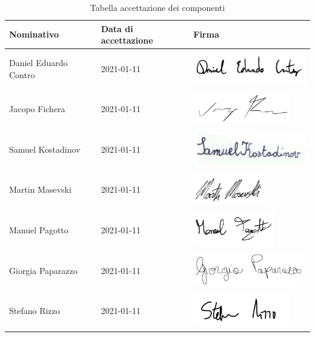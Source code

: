 \documentclass[../piano_di_progetto.tex]{subfiles}
\begin{document}
\begin{table}[!ht]
	\centering
	\begin{tabular}{|l|l|l|}
		\hline
		\rowcolor{lightgray}
		\textbf{Nominativo} & \textbf{Data di accettazione} & \textbf{Firma} \\ 
		\hline
		Daniel Eduardo Contro & 2021-01-11 & \includegraphics[height=1.5cm]{componenti/img/firma_dec} \\ 
		\hline
		Jacopo Fichera & 2021-01-11 & \includegraphics[height=1.5cm]{componenti/img/firma_jf} \\ 
		\hline
		Samuel Kostadinov & 2021-01-11 & \includegraphics[height=1.5cm]{componenti/img/firma_sk} \\
		\hline
		Martin Masevski & 2021-01-11 & \includegraphics[height=1.5cm]{componenti/img/firma_mm} \\ 
		\hline
		Manuel Pagotto & 2021-01-11 & \includegraphics[height=1.5cm]{componenti/img/firma_mp}  \\ 
		\hline
		Giorgia Paparazzo & 2021-01-11 & \includegraphics[height=1.5cm]{componenti/img/firma_gp} \\
		\hline
		Stefano Rizzo & 2021-01-11 & \includegraphics[height=1.5cm]{componenti/img/firma_sr}  \\ 
		\hline

	\end{tabular}
		\caption{Tabella accettazione dei componenti}
\end{table}
\end{document}
